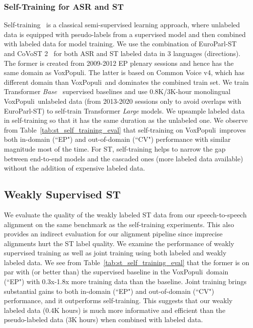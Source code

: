\documentclass[11pt,a4paper]{article}
\newcommand{\vp}{VoxPopuli}
\begin{document}
\subsubsection{Self-Training for ASR and ST}
\label{sec:self_training}
Self-training~\citep{scudder1965probability} is a classical semi-supervised learning approach, where unlabeled data is equipped with pseudo-labels from a supervised model and then combined with labeled data for model training. We use the combination of EuroParl-ST~\citep{iranzo2020europarl} and CoVoST 2~\citep{wang2020covost} for both ASR and ST labeled data in 3 languages (directions). The former is created from 2009-2012 EP plenary sessions and hence has the same domain as \vp. The latter is based on Common Voice v4, which has different domain than \vp~and dominates the combined train set. We train Transformer \emph{Base}~\citep{NIPS2017_3f5ee243} supervised baselines and use 0.8K/3K-hour monolingual \vp~unlabeled data (from 2013-2020 sessions only to avoid overlaps with EuroParl-ST) to self-train Transformer \emph{Large} models. We upsample labeled data in self-training so that it has the same duration as the unlabeled one. We observe from Table~\ref{tab:st_self_training_eval} that self-training on \vp~improves both in-domain (``EP") and out-of-domain (``CV") performance with similar magnitude most of the time. For ST, self-training helps to narrow the gap between end-to-end models and the cascaded ones (more labeled data available) without the addition of expensive labeled data.

\subsection{Weakly Supervised ST}
We evaluate the quality of the weakly labeled ST data from our speech-to-speech alignment on the same benchmark as the self-training experiments. This also provides an indirect evaluation for our alignment pipeline since imprecise alignments hurt the ST label quality. 
We examine the performance of weakly supervised training as well as joint training using both labeled and weakly labeled data. We see from Table~\ref{tab:st_self_training_eval} that the former is on par with (or better than) the supervised baseline in the \vp~domain (``EP") with 0.3x-1.8x more training data than the baseline. Joint training brings substantial gains to both in-domain (``EP") and out-of-domain (``CV") performance, and it outperforms self-training. This suggests that our weakly labeled data (0.4K hours) is much more informative and efficient than the pseudo-labeled data (3K hours) when combined with labeled data.
\end{document}
